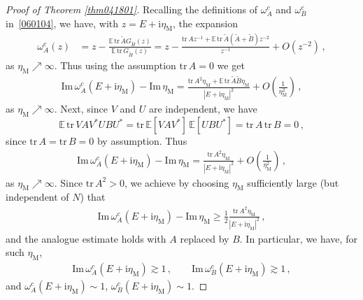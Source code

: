 \documentclass[10pt,reqno]{amsart}
\numberwithin{equation}{section}
\theoremstyle{plain}
\numberwithin{kevin}{section}
\theoremstyle{remark}
\newcommand{\im}{\mathrm{Im}\,}
\newcommand{\E}{{\mathbb E }}
\newcommand{\ii}{\mathrm{i}}
\newcommand{\ntr}{\mathrm{tr}\,}
\begin{document}
\begin{proof}[Proof of Theorem \ref{thm041801}]
Recalling the definitions of $\omega_A^c$ and $\omega_B^c$ in~\eqref{060104}, we have, with $z=E+\ii\eta_{\mathrm{M}}$, the expansion
\begin{align*}
 \omega_A^c(z)&=z-\frac{\E\,\ntr\! \widetilde A G_{\widetilde H}(z) }{\E\, \ntr G_{\widetilde H}(z)}=z-\frac{\ntr A z^{-1}+\E\,\ntr \widetilde A (\widetilde A+\widetilde B)z^{-2}}{z^{-1}}+O(z^{-2})\,,
\end{align*}
as $\eta_{\mathrm{M}}\nearrow\infty$. Thus using the assumption $\ntr A=0$ we get
\begin{align*}
 \im \omega_A^c(E+\ii\eta_{\mathrm{M}})-\im \eta_{\mathrm{M}}=\frac{\ntr A^2\eta_{\mathrm{M}}+\E\,\ntr\widetilde A\widetilde B\eta_{\mathrm{M}}}{|E+\ii\eta_{\mathrm{M}}|^2}+O\left(\frac{1}{\eta_{\mathrm{M}}^2}\right)\,,
\end{align*}
as $\eta_{\mathrm{M}}\nearrow\infty$. Next, since $V$ and $U$ are independent, we have $$\E\,\ntr VAV^* UBU^*=\ntr \E [VAV^*]\, \E[ UBU^*]=\ntr A\,\ntr B=0\,,$$
since $\ntr A=\ntr B=0$ by assumption. Thus
\begin{align}
 \im \omega_A^c(E+\ii\eta_{\mathrm{M}})-\im \eta_{\mathrm{M}}=\frac{\ntr A^2\eta_{\mathrm{M}}}{|E+\ii\eta_{\mathrm{M}}|^2}+O\left(\frac{1}{\eta_{\mathrm{M}}^2}\right)\,,
\end{align}
as $\eta_{\mathrm{M}}\nearrow\infty$. Since $\ntr A^2>0$, we achieve by choosing $\eta_{\mathrm{M}}$ sufficiently large (but independent of $N$) that
\begin{align}\label{corviglia}
 \im \omega_A^c(E+\ii\eta_{\mathrm{M}})-\im \eta_{\mathrm{M}}\ge\frac{1}{2}\frac{\ntr A^2\eta_{\mathrm{M}}}{|E+\ii\eta_{\mathrm{M}}|^2}\,,
\end{align}
and the analogue estimate holds with $A$ replaced by $B$. In particular, we have, for such $\eta_{\mathrm{M}}$,
\begin{align}\label{072206}
\im \omega_A^c(E+\ii\eta_{\mathrm{M}})\gtrsim 1\,,\qquad \im \omega_B^c(E+\ii\eta_{\mathrm{M}})\gtrsim 1\,,
\end{align}
and $\omega_A^c(E+\ii\eta_{\mathrm{M}})\sim 1$, $\omega_B^c(E+\ii\eta_{\mathrm{M}})\sim 1$.


\end{proof}
\end{document}

